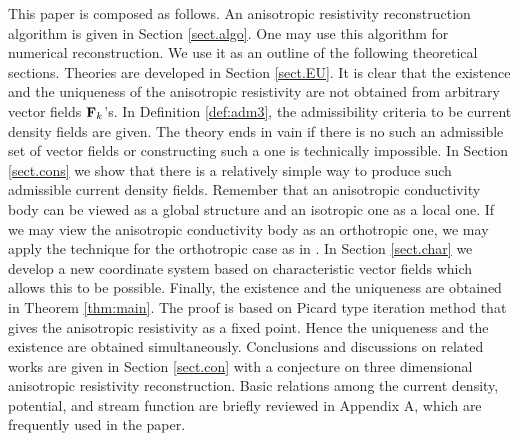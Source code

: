 \documentclass[11pt]{amsart}
\theoremstyle{plain}
\numberwithin{equation}{section}
\numberwithin{Thm}{section}
\def\F{{\bf F}}
\begin{document}
This paper is composed as follows. An anisotropic resistivity reconstruction algorithm is given in Section \ref{sect.algo}. One may use this algorithm for numerical reconstruction. We use it as an outline of the following theoretical sections. Theories are developed in Section \ref{sect.EU}. It is clear that the existence and the uniqueness of the anisotropic resistivity are not obtained from arbitrary vector fields $\F_k$'s. In Definition \ref{def:adm3}, the admissibility criteria to be current density fields are given. The theory ends in vain if there is no such an admissible set of vector fields or constructing such a one is technically impossible. In Section \ref{sect.cons} we show that there is a relatively simple way to produce such admissible current density fields. Remember that an anisotropic conductivity body can be viewed as a global structure and an isotropic one as a local one. If we may view the anisotropic conductivity body as an orthotropic one, we may apply the technique for the orthotropic case as in \cite{lee_orthotropic_2015}. In Section \ref{sect.char} we develop a new coordinate system based on characteristic vector fields which allows this to be possible. Finally, the existence and the uniqueness are obtained in Theorem \ref{thm:main}. The proof is based on Picard type iteration method that gives the anisotropic resistivity as a fixed point. Hence the uniqueness and the existence are obtained simultaneously. Conclusions and discussions on related works are given in Section \ref{sect.con} with a conjecture on three dimensional anisotropic resistivity reconstruction. Basic relations among the current density, potential, and stream function are briefly reviewed in Appendix A, which are frequently used in the paper.
\end{document}
